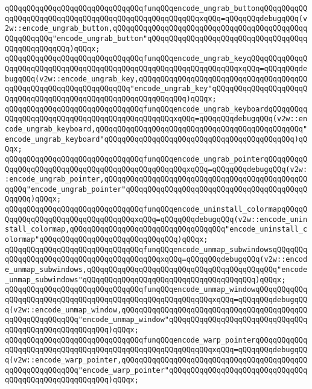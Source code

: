 \verb|qQQqqQQqqQQqqQQqqQQqqQQqqQQqqQQqfunqQQqencode_ungrab_buttonqQQqqQQqqQQqqQQqqQQqqQQqqQQqqQQqqQQqqQQqqQQqqQQqqQQqqQQqxqQQq=qQQqqQQqdebugqQQq(v2w::encode_ungrab_button,qQQqqQQqqQQqqQQqqQQqqQQqqQQqqQQqqQQqqQQqqQQqqQQqqQQqqQQq"encode_ungrab_button"qQQqqQQqqQQqqQQqqQQqqQQqqQQqqQQqqQQqqQQqqQQqqQQqqQQq)qQQqx;|\newline
\verb|qQQqqQQqqQQqqQQqqQQqqQQqqQQqqQQqfunqQQqencode_ungrab_keyqQQqqQQqqQQqqQQqqQQqqQQqqQQqqQQqqQQqqQQqqQQqqQQqqQQqqQQqqQQqqQQqqQQqxqQQq=qQQqqQQqdebugqQQq(v2w::encode_ungrab_key,qQQqqQQqqQQqqQQqqQQqqQQqqQQqqQQqqQQqqQQqqQQqqQQqqQQqqQQqqQQqqQQqqQQq"encode_ungrab_key"qQQqqQQqqQQqqQQqqQQqqQQqqQQqqQQqqQQqqQQqqQQqqQQqqQQqqQQqqQQqqQQq)qQQqx;|\newline
\verb|qQQqqQQqqQQqqQQqqQQqqQQqqQQqqQQqfunqQQqencode_ungrab_keyboardqQQqqQQqqQQqqQQqqQQqqQQqqQQqqQQqqQQqqQQqqQQqqQQqxqQQq=qQQqqQQqdebugqQQq(v2w::encode_ungrab_keyboard,qQQqqQQqqQQqqQQqqQQqqQQqqQQqqQQqqQQqqQQqqQQqqQQq"encode_ungrab_keyboard"qQQqqQQqqQQqqQQqqQQqqQQqqQQqqQQqqQQqqQQqqQQq)qQQqx;|\newline
\verb|qQQqqQQqqQQqqQQqqQQqqQQqqQQqqQQqfunqQQqencode_ungrab_pointerqQQqqQQqqQQqqQQqqQQqqQQqqQQqqQQqqQQqqQQqqQQqqQQqqQQqxqQQq=qQQqqQQqdebugqQQq(v2w::encode_ungrab_pointer,qQQqqQQqqQQqqQQqqQQqqQQqqQQqqQQqqQQqqQQqqQQqqQQqqQQq"encode_ungrab_pointer"qQQqqQQqqQQqqQQqqQQqqQQqqQQqqQQqqQQqqQQqqQQqqQQq)qQQqx;|\newline
\verb|qQQqqQQqqQQqqQQqqQQqqQQqqQQqqQQqfunqQQqencode_uninstall_colormapqQQqqQQqqQQqqQQqqQQqqQQqqQQqqQQqqQQqxqQQq=qQQqqQQqdebugqQQq(v2w::encode_uninstall_colormap,qQQqqQQqqQQqqQQqqQQqqQQqqQQqqQQqqQQq"encode_uninstall_colormap"qQQqqQQqqQQqqQQqqQQqqQQqqQQqqQQq)qQQqx;|\newline
\verb|qQQqqQQqqQQqqQQqqQQqqQQqqQQqqQQqfunqQQqencode_unmap_subwindowsqQQqqQQqqQQqqQQqqQQqqQQqqQQqqQQqqQQqqQQqqQQqxqQQq=qQQqqQQqdebugqQQq(v2w::encode_unmap_subwindows,qQQqqQQqqQQqqQQqqQQqqQQqqQQqqQQqqQQqqQQqqQQq"encode_unmap_subwindows"qQQqqQQqqQQqqQQqqQQqqQQqqQQqqQQqqQQqqQQq)qQQqx;|\newline
\verb|qQQqqQQqqQQqqQQqqQQqqQQqqQQqqQQqfunqQQqencode_unmap_windowqQQqqQQqqQQqqQQqqQQqqQQqqQQqqQQqqQQqqQQqqQQqqQQqqQQqqQQqqQQqxqQQq=qQQqqQQqdebugqQQq(v2w::encode_unmap_window,qQQqqQQqqQQqqQQqqQQqqQQqqQQqqQQqqQQqqQQqqQQqqQQqqQQqqQQqqQQq"encode_unmap_window"qQQqqQQqqQQqqQQqqQQqqQQqqQQqqQQqqQQqqQQqqQQqqQQqqQQqqQQq)qQQqx;|\newline
\verb|qQQqqQQqqQQqqQQqqQQqqQQqqQQqqQQqfunqQQqencode_warp_pointerqQQqqQQqqQQqqQQqqQQqqQQqqQQqqQQqqQQqqQQqqQQqqQQqqQQqqQQqqQQqxqQQq=qQQqqQQqdebugqQQq(v2w::encode_warp_pointer,qQQqqQQqqQQqqQQqqQQqqQQqqQQqqQQqqQQqqQQqqQQqqQQqqQQqqQQqqQQq"encode_warp_pointer"qQQqqQQqqQQqqQQqqQQqqQQqqQQqqQQqqQQqqQQqqQQqqQQqqQQqqQQq)qQQqx;|\newline
